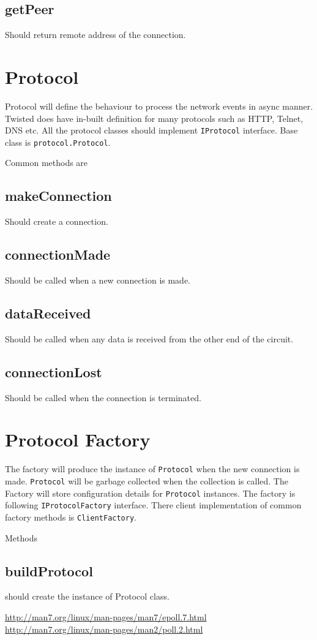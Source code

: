 \documentclass{article}
\begin{document}
    \subsection{getPeer} Should return remote address of the connection.

  \section{Protocol}
    Protocol will define the behaviour to process the network events in async
    manner. Twisted does have in-built definition for many protocols such as
    HTTP, Telnet, DNS etc. All the protocol classes should implement
    \texttt{IProtocol} interface. Base class is \texttt{protocol.Protocol}.

    Common methods are

    \subsection{makeConnection} Should create a connection.

    \subsection{connectionMade} Should be called when a new connection is made.

    \subsection{dataReceived} Should be called when any data is received from
    the other end of the circuit.

    \subsection{connectionLost} Should be called when the connection is
    terminated.

  \section{Protocol Factory}
    The factory will produce the instance of \texttt{Protocol} when the new
    connection is made. \texttt{Protocol} will be garbage collected when the
    collection is called. The Factory will store configuration details for
    \texttt{Protocol} instances. The factory is following
    \texttt{IProtocolFactory} interface. There client implementation of common
    factory methods is \texttt{ClientFactory}.

    Methods

    \subsection{buildProtocol} should create the instance of Protocol class.

  \begin{thebibliography}{2}
      \url{http://man7.org/linux/man-pages/man7/epoll.7.html}%
      \url{http://man7.org/linux/man-pages/man2/poll.2.html}%
  \end{thebibliography}
\end{document}

